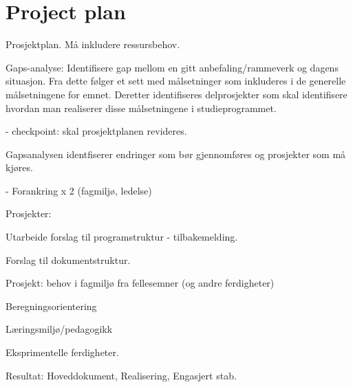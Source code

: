 \section{Project plan}

Prosjektplan. Må inkludere ressursbehov.

Gaps-analyse: Identifisere gap mellom en gitt anbefaling/rammeverk og dagens situasjon. Fra dette følger et sett med målsetninger som inkluderes i de generelle målsetningene for emnet. Deretter identifiseres delprosjekter som skal identifisere hvordan man realiserer disse målsetningene i studieprogrammet.

- checkpoint: skal prosjektplanen revideres.

Gapsanalysen identfiserer endringer som bør gjennomføres og prosjekter som må kjøres.

- Forankring x 2 (fagmiljø, ledelse)

Prosjekter:

Utarbeide forslag til programstruktur - tilbakemelding.

Forslag til dokumentstruktur.

Prosjekt: behov i fagmiljø fra fellesemner (og andre ferdigheter)

Beregningsorientering

Læringsmiljø/pedagogikk

Eksprimentelle ferdigheter.

Resultat: Hoveddokument, Realisering, Engasjert stab.

